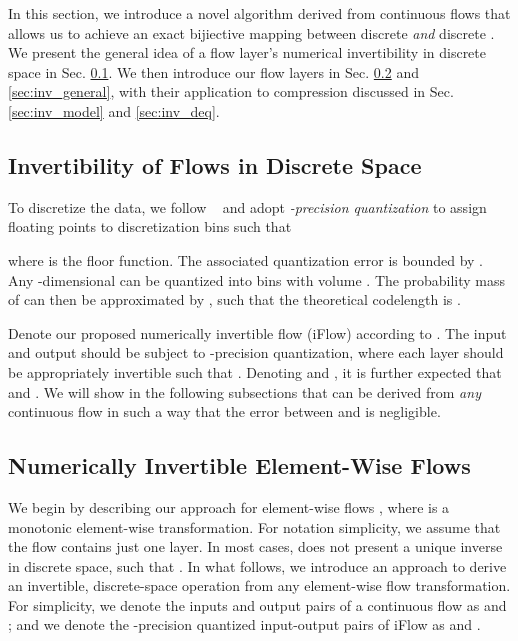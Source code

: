 \documentclass{article}
\begin{document}
In this section, we introduce a novel algorithm derived from continuous flows that allows us to achieve an exact bijiective mapping between discrete  \textit{and} discrete . We present the general idea of a flow layer's numerical invertibility in discrete space in Sec. \ref{sec:k_precision}. We then introduce our flow layers in Sec. \ref{sec:inv_eleflow} and \ref{sec:inv_general}, with their application to compression discussed in Sec. \ref{sec:inv_model} and \ref{sec:inv_deq}.

\subsection{Invertibility of Flows in Discrete Space}
\label{sec:k_precision}

To discretize the data, we follow ~\cite{zhang2021ivpf} and adopt {\em -precision quantization} to assign floating points to discretization bins such that

where  is the floor function. The associated quantization error is bounded by . Any -dimensional  can be quantized into bins with volume . The probability mass of  can then be approximated by , such that the theoretical codelength is .

Denote our proposed numerically invertible flow (iFlow) according to . The input and output should be subject to -precision quantization, where each layer should be appropriately invertible such that . Denoting  and , it is further expected that  and . We will show in the following subsections that  can be derived from \textit{any} continuous flow  in such a way that the error between  and  is negligible.

\subsection{Numerically Invertible Element-Wise Flows}
\label{sec:inv_eleflow}

We begin by describing our approach for element-wise flows , where  is a monotonic element-wise transformation. For notation simplicity, we assume that the flow contains just one layer.
In most cases,  does not present a unique inverse in discrete space, such that . 
In what follows, we introduce an approach to derive an invertible, discrete-space operation from any element-wise flow transformation.
For simplicity, we denote the inputs and output pairs of a continuous flow as  and ; and we denote the -precision quantized input-output pairs of iFlow as  and .
\end{document}
